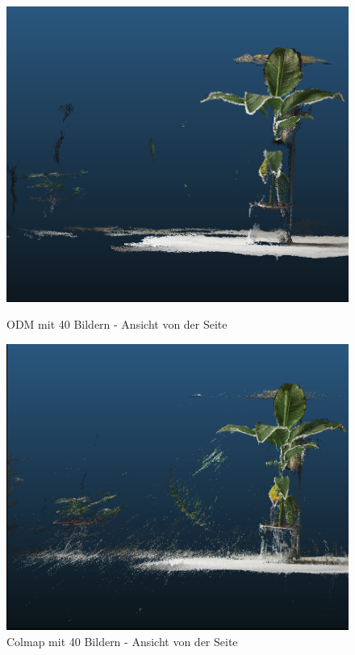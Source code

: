 \documentclass[12pt,titlepage, twoside]{article}
\begin{document}
\begin{figure}
    \centering
    \begin{minipage}{0.475\textwidth}
        \centering
        \includegraphics[width=1.0\textwidth]{./Images/ODMNoise2.png}
        \caption{ODM mit 40 Bildern - Ansicht von der Seite}
        \label{fig:ODMNoise}
    \end{minipage}\hfill
    \begin{minipage}{0.475\textwidth}
        \centering
        \includegraphics[width=1.0\textwidth]{./Images/ColmapNoise2.png}
        \caption{Colmap mit 40 Bildern - Ansicht von der Seite}
        \label{fig:ColmapNoise}
    \end{minipage}
\end{figure}
\end{document}
